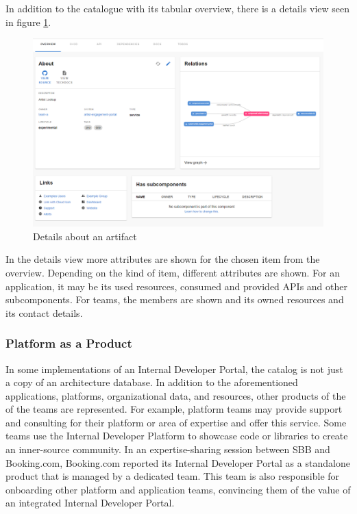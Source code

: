 \documentclass[a4paper,12pt]{article}
\begin{document}
    In addition to the catalogue with its tabular overview, there is a details view seen in figure \ref{fig:portaldetails}.
    \begin{figure}
        \includegraphics[width=\linewidth]{backstage_item_details}
        \caption{Details about an artifact}
        \label{fig:portaldetails}
    \end{figure}
    In the details view more attributes are shown for the chosen item from the overview.
    Depending on the kind of item, different attributes are shown.
    For an application, it may be its used resources, consumed and provided APIs and other subcomponents.
    For teams, the members are shown and its owned resources and its contact details.


    \subsubsection{Platform as a Product}
    \label{sssec:paap}
    In some implementations of an Internal Developer Portal, the catalog is not just a copy of an architecture database.
    In addition to the aforementioned applications, platforms, organizational data, and resources, other products of the
    of the teams are represented.
    For example, platform teams may provide support and consulting for their platform or area of expertise and offer this service.
    Some teams use the Internal Developer Platform to showcase code or libraries to create an inner-source community.
    In an expertise-sharing session between SBB and Booking.com, Booking.com reported its Internal Developer Portal as a
    standalone product that is managed by a dedicated team.
    This team is also responsible for onboarding other platform and application teams, convincing them of the
    value of an integrated Internal Developer Portal.
\end{document}
